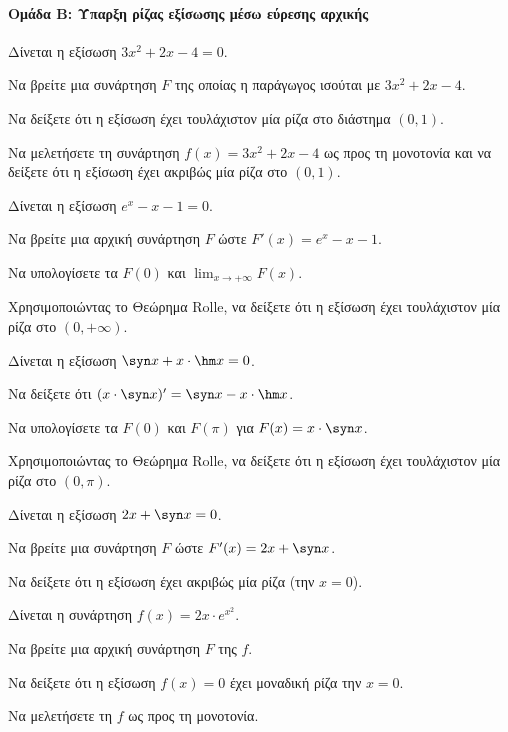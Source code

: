 \documentclass[11pt,a4paper,modern]{FFExercises}
\begin{document}
\paragraph{Ομάδα Β: Ύπαρξη ρίζας εξίσωσης μέσω εύρεσης αρχικής}

\askhsh
Δίνεται η εξίσωση $3x^2 + 2x - 4 = 0$.
\begin{alist}
  \item Να βρείτε μια συνάρτηση $F$ της οποίας η παράγωγος ισούται με $3x^2 + 2x - 4$.
  \item Να δείξετε ότι η εξίσωση έχει τουλάχιστον μία ρίζα στο διάστημα $(0, 1)$.
  \item Να μελετήσετε τη συνάρτηση $f(x) = 3x^2 + 2x - 4$ ως προς τη μονοτονία και να δείξετε ότι η εξίσωση έχει ακριβώς μία ρίζα στο $(0, 1)$.
\end{alist}

\askhsh
Δίνεται η εξίσωση $e^x - x - 1 = 0$.
\begin{alist}
  \item Να βρείτε μια αρχική συνάρτηση $F$ ώστε $F'(x) = e^x - x - 1$.
  \item Να υπολογίσετε τα $F(0)$ και $\displaystyle\lim_{x \to +\infty} F(x)$.
  \item Χρησιμοποιώντας το Θεώρημα Rolle, να δείξετε ότι η εξίσωση έχει τουλάχιστον μία ρίζα στο $(0, +\infty)$.
\end{alist}

\askhsh
Δίνεται η εξίσωση $\syn x + x \cdot \hm x = 0$.
\begin{alist}
  \item Να δείξετε ότι $(x \cdot \syn x)' = \syn x - x \cdot \hm x$.
  \item Να υπολογίσετε τα $F(0)$ και $F(\pi)$ για $F(x) = x \cdot \syn x$.
  \item Χρησιμοποιώντας το Θεώρημα Rolle, να δείξετε ότι η εξίσωση έχει τουλάχιστον μία ρίζα στο $(0, \pi)$.
\end{alist}

\askhsh
Δίνεται η εξίσωση $2x + \syn x = 0$.
\begin{alist}
  \item Να βρείτε μια συνάρτηση $F$ ώστε $F'(x) = 2x + \syn x$.
  \item Να δείξετε ότι η εξίσωση έχει ακριβώς μία ρίζα (την $x = 0$).
\end{alist}

\askhsh
Δίνεται η συνάρτηση $f(x) = 2x \cdot e^{x^2}$.
\begin{alist}
  \item Να βρείτε μια αρχική συνάρτηση $F$ της $f$.
  \item Να δείξετε ότι η εξίσωση $f(x) = 0$ έχει μοναδική ρίζα την $x = 0$.
  \item Να μελετήσετε τη $f$ ως προς τη μονοτονία.
\end{alist}
\end{document}

